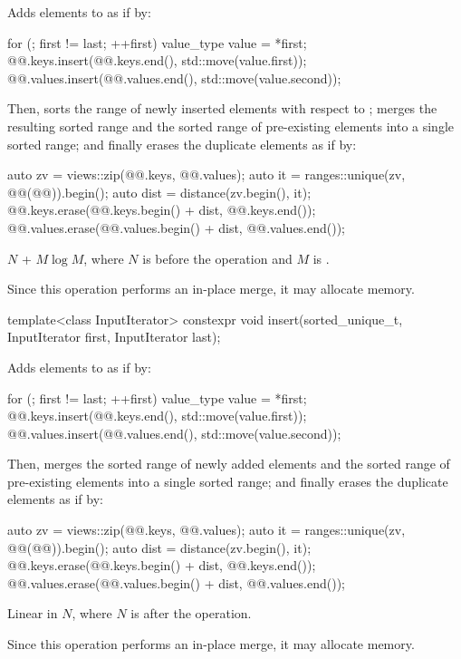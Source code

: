 \begin{itemdescr}
\pnum
\effects
Adds elements to  as if by:
\begin{codeblock}
for (; first != last; ++first) {
  value_type value = *first;
  @@.keys.insert(@@.keys.end(), std::move(value.first));
  @@.values.insert(@@.values.end(), std::move(value.second));
}
\end{codeblock}
Then, sorts the range of newly inserted elements
with respect to ;
merges the resulting sorted range and
the sorted range of pre-existing elements into a single sorted range; and
finally erases the duplicate elements as if by:
\begin{codeblock}
auto zv = views::zip(@@.keys, @@.values);
auto it = ranges::unique(zv, @@(@@)).begin();
auto dist = distance(zv.begin(), it);
@@.keys.erase(@@.keys.begin() + dist, @@.keys.end());
@@.values.erase(@@.values.begin() + dist, @@.values.end());
\end{codeblock}

\pnum
\complexity
$N$ + $M \log M$,
where $N$ is  before the operation and
$M$ is .

\pnum
\remarks
Since this operation performs an in-place merge, it may allocate memory.
\end{itemdescr}

%
\begin{itemdecl}
template<class InputIterator>
  constexpr void insert(sorted_unique_t, InputIterator first, InputIterator last);
\end{itemdecl}

\begin{itemdescr}
\pnum
\effects
Adds elements to  as if by:
\begin{codeblock}
for (; first != last; ++first) {
  value_type value = *first;
  @@.keys.insert(@@.keys.end(), std::move(value.first));
  @@.values.insert(@@.values.end(), std::move(value.second));
}
\end{codeblock}
Then, merges the sorted range of newly added elements and
the sorted range of pre-existing elements into a single sorted range; and
finally erases the duplicate elements as if by:
\begin{codeblock}
auto zv = views::zip(@@.keys, @@.values);
auto it = ranges::unique(zv, @@(@@)).begin();
auto dist = distance(zv.begin(), it);
@@.keys.erase(@@.keys.begin() + dist, @@.keys.end());
@@.values.erase(@@.values.begin() + dist, @@.values.end());
\end{codeblock}

\pnum
\complexity
Linear in $N$, where $N$ is  after the operation.

\pnum
\remarks
Since this operation performs an in-place merge, it may allocate memory.
\end{itemdescr}

